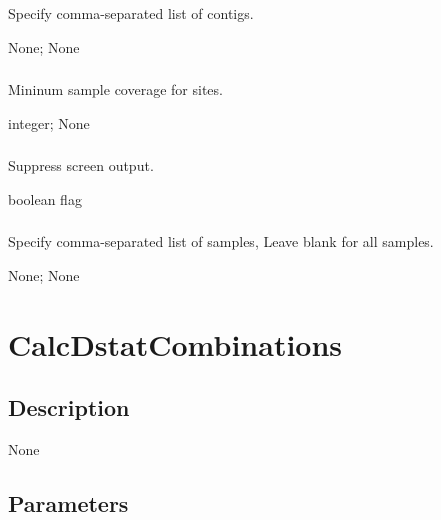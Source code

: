 \documentclass[letterpaper,11pt,english]{sphinxmanual}
\begin{document}
\subsubsection{}
\label{\detokenize{prog_desc:id47}}
 Specify comma-separated list of contigs.

 None;  None


\subsubsection{}
\label{\detokenize{prog_desc:mincoverage}}
 Mininum sample coverage for sites.

 integer;  None


\subsubsection{}
\label{\detokenize{prog_desc:id48}}
 Suppress screen output.

 boolean flag


\subsubsection{}
\label{\detokenize{prog_desc:id49}}
 Specify comma-separated list of samples, Leave blank for all samples.

 None;  None


\section{CalcDstatCombinations}
\label{\detokenize{prog_desc:calcdstatcombinations}}

\subsection{Description}
\label{\detokenize{prog_desc:id50}}
None


\subsection{Parameters}
\label{\detokenize{prog_desc:id51}}
\end{document}
